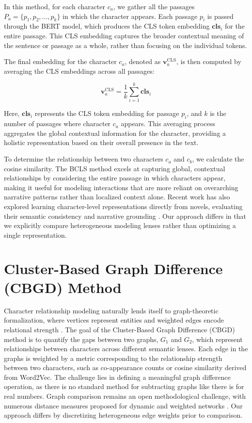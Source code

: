\documentclass[a4paper,12pt]{report}
\begin{document}
In this method, for each character $c_a$, we gather all the passages $P_a = \{p_1, p_2, \dots, p_k\}$ in which the character appears. Each passage $p_i$ is passed through the BERT model, which produces the CLS token embedding $\mathbf{cls}_i$ for the entire passage. This CLS embedding captures the broader contextual meaning of the sentence or passage as a whole, rather than focusing on the individual tokens. 

The final embedding for the character $c_a$, denoted as $\mathbf{v}_a^{\text{CLS}}$, is then computed by averaging the CLS embeddings across all passages:

\[
\mathbf{v}_a^{\text{CLS}} = \frac{1}{k} \sum_{i=1}^{k} \mathbf{cls}_i
\]

Here, $\mathbf{cls}_i$ represents the CLS token embedding for passage $p_i$, and $k$ is the number of passages where character $c_a$ appears. This averaging process aggregates the global contextual information for the character, providing a holistic representation based on their overall presence in the text.

To determine the relationship between two characters $c_a$ and $c_b$, we calculate the cosine similarity.
The BCLS method excels at capturing global, contextual relationships by considering the entire passage in which characters appear, making it useful for modeling interactions that are more reliant on overarching narrative patterns rather than localized context alone.
Recent work has also explored learning character-level representations directly from novels, evaluating their semantic consistency and narrative grounding \cite{INOUE2022Learning}. Our approach differs in that we explicitly compare heterogeneous modeling lenses rather than optimizing a single representation.

\section{Cluster-Based Graph Difference (CBGD) Method}
\label{CBGD}
Character relationship modeling naturally lends itself to graph-theoretic formalization, where vertices represent entities and weighted edges encode relational strength \cite{NEWMAN2010Networks}.
The goal of the Cluster-Based Graph Difference (CBGD) method is to quantify the gaps between two graphs, \( G_1 \) and \( G_2 \), which represent relationships between characters across different semantic lenses. Each edge in the graphs is weighted by a metric corresponding to the relationship strength between two characters, such as co-appearance counts or cosine similarity derived from Word2Vec. The challenge lies in defining a meaningful graph difference operation, as there is no standard method for subtracting graphs like there is for real numbers. Graph comparison remains an open methodological challenge, with numerous distance measures proposed for dynamic and weighted networks \cite{DONNAT2018GraphComparison}. Our approach differs by discretizing heterogeneous edge weights prior to comparison.
\end{document}

